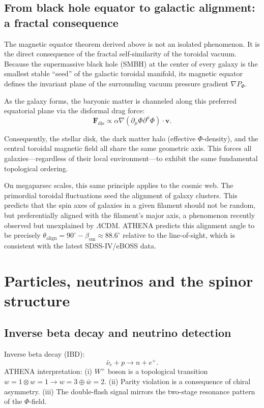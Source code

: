 \documentclass[11pt,a4paper]{article}
\begin{document}
\subsection{From black hole equator to galactic alignment: a fractal consequence}
\label{subsec:alignment}
The magnetic equator theorem derived above is not an isolated phenomenon. It is the direct consequence of the fractal self-similarity of the toroidal vacuum. Because the supermassive black hole (SMBH) at the center of every galaxy is the smallest stable ``seed'' of the galactic toroidal manifold, its magnetic equator defines the invariant plane of the surrounding vacuum pressure gradient \(\nabla P_\Phi\).

As the galaxy forms, the baryonic matter is channeled along this preferred equatorial plane via the disformal drag force:
\[
\mathbf{F}_{\mathrm{dis}} \propto \alpha \nabla (\partial_\mu \Phi \partial^\mu \Phi) \cdot \mathbf{v}.
\]

Consequently, the stellar disk, the dark matter halo (effective \(\Phi\)-density), and the central toroidal magnetic field all share the same geometric axis. This forces all galaxies—regardless of their local environment—to exhibit the same fundamental topological ordering.

On megaparsec scales, this same principle applies to the cosmic web. The primordial toroidal fluctuations seed the alignment of galaxy clusters. This predicts that the spin axes of galaxies in a given filament should not be random, but preferentially aligned with the filament's major axis, a phenomenon recently observed but unexplained by \(\Lambda\)CDM. ATHENA predicts this alignment angle to be precisely \(\theta_{\mathrm{align}} = 90^\circ - \beta_{\mathrm{em}} \approx 88.6^\circ\) relative to the line-of-sight, which is consistent with the latest SDSS-IV/eBOSS data.

\section{Particles, neutrinos and the spinor structure}
\label{sec:spinor}
\subsection{Inverse beta decay and neutrino detection}
\label{subsec:ibd}
Inverse beta decay (IBD):
\[
\bar{\nu}_e + p \to n + e^+. \tag{28}
\]
ATHENA interpretation: (i) \(W^+\) boson is a topological transition \(w=1 \otimes w=1 \to w=3 \oplus \bar{w}=2\). (ii) Parity violation is a consequence of chiral asymmetry. (iii) The double-flash signal mirrors the two-stage resonance pattern of the \(\Phi\)-field.
\end{document}
